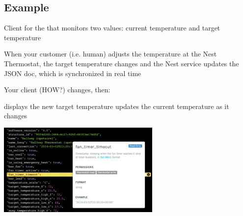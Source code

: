 \documentclass{myproc}
\begin{document}
\subsection{Example}
\bit
\w Client for the  that monitors two values:
\textcolor{blue2}{current temperature} and \textcolor{blue2}{target
  temperature}

\w When your customer (i.e. human) adjusts the temperature at the Nest
Thermostat, the \textcolor{blue2}{target temperature} changes and the Nest
service updates the JSON doc, which is synchronized in real time 

\w Your client \textcolor{red2}{} (HOW?) changes, then:

  \bit
  \w displays the new target temperature
  \w updates the current temperature as it changes
  \eit

\includegraphics[width=8cm]{pics/api-viewer}
\eit
\end{document}
